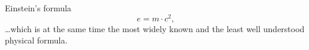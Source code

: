 \documentclass{article}
\begin{document}
Einstein's formula
\begin{equation}
e = m \cdot c^2,
\end{equation}
\ldots which is at the same time the most widely known
and the least well understood physical formula.
\end{document}
